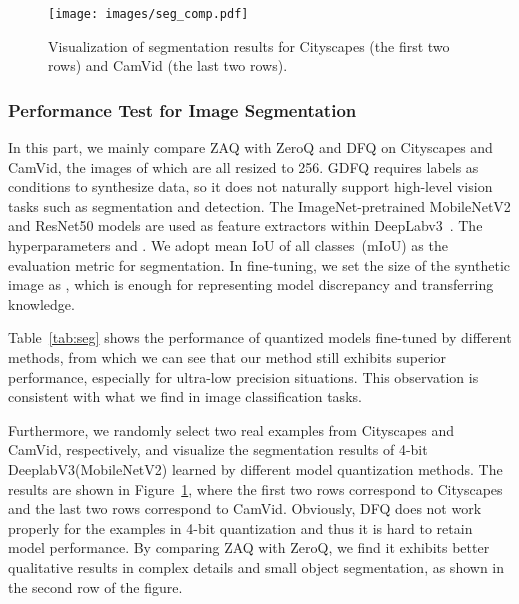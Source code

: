 \documentclass[final]{cvpr}
\begin{document}
\begin{figure}[!t]
  \centering
  \texttt{[image: images/seg\_comp.pdf]}
  \caption{Visualization of segmentation results for Cityscapes (the first two rows) and CamVid (the last two rows).}
  \label{fig:visual_real_seg}
\end{figure}

\subsubsection{Performance Test for Image Segmentation}

In this part, we mainly compare ZAQ with ZeroQ and DFQ on Cityscapes and CamVid, the images of which are all resized to 256.
GDFQ requires labels as conditions to synthesize data, so it does not naturally support high-level vision tasks such as segmentation and detection.
The ImageNet-pretrained MobileNetV2 and ResNet50 models are used as feature extractors within DeepLabv3~\cite{chen2017rethinking}. The hyperparameters  and . 
We adopt mean IoU of all classes~(mIoU) as the evaluation metric for segmentation. 
In fine-tuning, we set the size of the synthetic image as , which is enough for representing model discrepancy and transferring knowledge.

Table~\ref{tab:seg} shows the performance of quantized models fine-tuned by different methods, from which we can see that our method still exhibits superior performance, especially for ultra-low precision situations.
This observation is consistent with what we find in image classification tasks.

Furthermore, we randomly select two real examples from Cityscapes and CamVid, respectively, and visualize the segmentation results of 4-bit DeeplabV3(MobileNetV2) learned by different model quantization methods.
The results are shown in Figure~\ref{fig:visual_real_seg}, where the first two rows correspond to Cityscapes and the last two rows correspond to CamVid.
Obviously, DFQ does not work properly for the examples in 4-bit quantization and thus it is hard to retain model performance. 
By comparing ZAQ with ZeroQ, we find it exhibits better qualitative results in complex details and small object segmentation, as shown in the second row of the figure.
\end{document}

